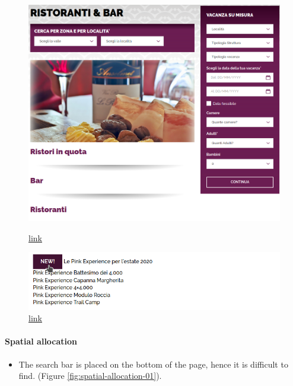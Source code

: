 \documentclass[a4paper, 11pt, parskip=half, headsepline]{scrreprt}
\begin{document}
\begin{figure}[H]
    \begin{minipage}[t]{0.5\textwidth}
        \centering
        \includegraphics[width=1\linewidth, keepaspectratio]{81-interaction-placeholders-links}
        \caption{\href{https://www.visitmonterosa.com/discover-monterosa/ristoranti-e-bar/}{link}}
        \label{fig:interaction-placeholder-01}
    \end{minipage}   
    \hspace*{\fill}
    \begin{minipage}[t]{0.5\textwidth}
        \centering
        \includegraphics[width=1\linewidth, keepaspectratio]{82-interaction-placeholders-labels}
        \caption{\href{https://www.visitmonterosa.com/monterosa-ski/monterosa-liberamente-femminile/}{link}}
        \label{fig:interaction-placeholder-02}
    \end{minipage} 
\end{figure}


\paragraph{Spatial allocation}
\begin{itemize}
	\item The search bar is placed on the bottom of the page, hence it is difficult to find. (Figure \ref{fig:spatial-allocation-01}).
\end{itemize}
\end{document}
